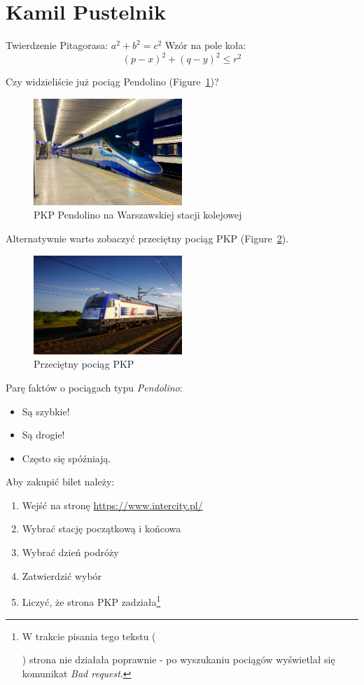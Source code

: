 \section{Kamil Pustelnik}
\label{sec:kpust}

Twierdzenie Pitagorasa: $a^2 + b^2 = c^2$
Wzór na pole koła: \[(p - x)^2 + (q - y)^2 \leq r^2\]

Czy widzieliście już pociąg Pendolino (Figure~\ref{fig:pendolino})?

\begin{figure}[htbp]
    \centering
    \includegraphics[width=0.5\textwidth]{pictures/Pendolino.jpg}
    \caption{PKP Pendolino na Warszawskiej stacji kolejowej}
    \label{fig:pendolino}
\end{figure}

Alternatywnie warto zobaczyć przeciętny pociąg PKP (Figure~\ref{fig:pociag_pkp}).

\begin{figure}[htbp]
    \centering
    \includegraphics[width=0.5\textwidth]{pictures/pociag_pkp.jpg}
    \caption{Przeciętny pociąg PKP}
    \label{fig:pociag_pkp}
\end{figure}

Parę faktów o pociągach typu \emph{Pendolino}:
\begin{itemize}
    \item Są szybkie!
    \item Są drogie!
    \item Często się spóźniają.
\end{itemize}

Aby zakupić bilet należy:
\begin{enumerate}
    \item Wejść na stronę \url{https://www.intercity.pl/}
    \item Wybrać stację początkową i końcowa
    \item Wybrać dzień podróży
    \item Zatwierdzić wybór
    \item Liczyć, że strona PKP zadziała\footnote{W trakcie pisania tego tekstu (\date{25.10.2023}) strona nie działała poprawnie - po wyszukaniu pociągów wyświetlał się komunikat \emph{Bad request}.}
\end{enumerate}

